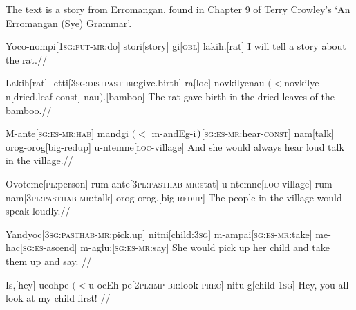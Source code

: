 \documentclass[12pt]{article}
\begin{document}


\bigskip

\noindent
The text is a story from Erromangan, found in Chapter 9 of Terry
Crowley's `An Erromangan (Sye) Grammar'.

\bigskip
\exdisplay
\begingl
Yoco-nompi[\textsc{1sg:fut-mr:}do]
stori[story]
gi[\textsc{obl}]
lakih.[rat]
\endilg
\glft I will tell a story about the rat.//
\endgl
 \xe

\exdisplay
\begingl
Lakih[rat]
-etti[\textsc{3sg:distpast-br:}give.birth]
ra[\sc loc]
{novkilyenau $(<$novkilye-n}[dried.leaf-\sc const]
nau$)$.[bamboo]
\endilg
\glft The rat gave birth in the dried leaves of the bamboo.//
\endgl
\xe

\exdisplay\begingl
M-ante[\textsc{sg:es-mr:hab}]
{mandgi $(<$ m-andEg-i$\mskip2mu)$}[\textsc{sg:es-mr:}hear-\textsc{const}]
nam[talk]
orog-orog[big-\sc redup]
u-ntemne[\textsc{loc}-village]
\endilg
\glft And she would always hear loud talk in the village.//
\endgl
\xe

\exdisplay
\begingl
Ovoteme[\textsc{pl}:person]
rum-ante[\textsc{3pl:pasthab-mr:}stat]
u-ntemne[\textsc{loc}-village]
rum-nam[\textsc{3pl:pasthab-mr:}talk]
orog-orog.[big-\textsc{redup}]
\endilg
\glft The people in the village would speak loudly.//
\endgl
\xe

\exdisplay
\begingl
Yandyoc[\textsc{3sg:pasthab-mr:}pick.up]%
nitni[child:\textsc{3sg}]
m-ampai[\textsc{sg:es-mr:}take]
me-hac[\textsc{sg:es-}ascend]
m-aglu:[\textsc{sg:es-mr:}say]
\endilg
\glft She would pick up her child and take them up and say. //
\endgl
\xe

\exdisplay
\begingl
Is,[hey]
{ucohpe $(<$u-ocEh-pe}[\textsc{2pl:imp-br:}look\textsc{-prec}]
nitu-g[child\textsc{-1sg}]
\endilg
\glft Hey, you all look at my child first! //
\endgl
\xe
\end{document}
